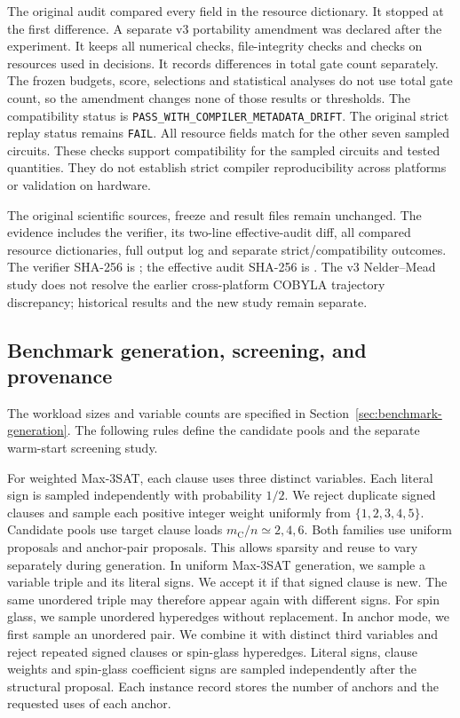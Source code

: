 \documentclass[a4paper,onecolumn,11pt,unpublished]{quantumarticle}
\theoremstyle{remark}
\begin{document}
The original audit compared every field in the resource dictionary. It
stopped at the first difference. A separate v3 portability amendment was
declared after the experiment. It keeps all numerical checks, file-integrity
checks and checks on resources used in decisions. It records differences
in total gate count separately. The frozen budgets, score, selections and
statistical analyses do not use total gate count, so the amendment changes
none of those results or thresholds.
The compatibility status is \nolinkurl{PASS_WITH_COMPILER_METADATA_DRIFT}.
The original strict replay status remains \nolinkurl{FAIL}.
All resource fields match for the other seven sampled circuits.
These checks support compatibility for the sampled circuits and tested
quantities. They do not establish strict compiler reproducibility across
platforms or validation on hardware.

The original scientific sources, freeze and result files remain unchanged. The evidence includes the verifier, its two-line effective-audit diff, all compared resource dictionaries, full output log and separate strict/compatibility outcomes. The verifier SHA-256 is
\texttt{};
the effective audit SHA-256 is
\texttt{}.
The v3 Nelder--Mead study does not resolve the earlier cross-platform COBYLA trajectory discrepancy; historical results and the new study remain separate.

\subsection{Benchmark generation, screening, and provenance}
\label{app:benchmark-generation}

The workload sizes and variable counts are specified in
Section~\ref{sec:benchmark-generation}. The following rules define the
candidate pools and the separate warm-start screening study.

For weighted Max-3SAT, each clause uses three distinct variables. Each literal
sign is sampled independently with probability $1/2$. We reject duplicate
signed clauses and sample each positive integer weight uniformly from
$\{1,2,3,4,5\}$. Candidate pools use target clause loads
$m_{\mathrm C}/n\simeq2,4,6$.
Both families use uniform proposals and anchor-pair proposals. This allows
sparsity and reuse to vary separately during generation.
In uniform Max-3SAT generation, we sample a variable triple and its literal
signs. We accept it if that signed clause is new. The same unordered triple
may therefore appear again with different signs. For spin glass, we sample
unordered hyperedges without replacement.
In anchor mode, we first sample an unordered pair. We combine it with
distinct third variables and reject repeated signed clauses or spin-glass
hyperedges. Literal signs, clause weights and spin-glass coefficient signs
are sampled independently after the structural proposal. Each instance record
stores the number of anchors and the requested uses of each anchor.
\end{document}
